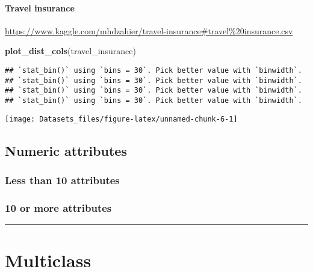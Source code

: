 \documentclass[]{article}
\newenvironment{Shaded}{\begin{snugshade}}{\end{snugshade}}
\newcommand{\KeywordTok}[1]{\textcolor[rgb]{0.13,0.29,0.53}{\textbf{#1}}}
\newcommand{\NormalTok}[1]{#1}
\let\oldparagraph\paragraph
\renewcommand{\paragraph}[1]{\oldparagraph{#1}\mbox{}}
\begin{document}
\hypertarget{Travel-insurance}{%
\paragraph{Travel insurance}\label{Travel-insurance}}

\url{https://www.kaggle.com/mhdzahier/travel-insurance\#travel\%20insurance.csv}

\begin{Shaded}
\begin{Highlighting}[]
\KeywordTok{plot_dist_cols}\NormalTok{(travel_insurance)}
\end{Highlighting}
\end{Shaded}

\begin{verbatim}
## `stat_bin()` using `bins = 30`. Pick better value with `binwidth`.
## `stat_bin()` using `bins = 30`. Pick better value with `binwidth`.
## `stat_bin()` using `bins = 30`. Pick better value with `binwidth`.
## `stat_bin()` using `bins = 30`. Pick better value with `binwidth`.
\end{verbatim}

\texttt{[image: Datasets\_files/figure-latex/unnamed-chunk-6-1]}

\hypertarget{numeric-attributes}{%
\subsection{Numeric attributes}\label{numeric-attributes}}

\hypertarget{less-than-10-attributes-2}{%
\subsubsection{Less than 10
attributes}\label{less-than-10-attributes-2}}

\hypertarget{or-more-attributes-2}{%
\subsubsection{10 or more attributes}\label{or-more-attributes-2}}

\begin{center}\rule{0.5\linewidth}{\linethickness}\end{center}

\hypertarget{multiclass}{%
\section{Multiclass}\label{multiclass}}
\end{document}
